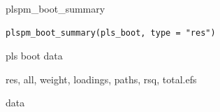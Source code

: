 \documentclass[a4paper]{book}
\begin{document}
%
\begin{Description}
plspm\_boot\_summary
\end{Description}
%
\begin{Usage}
\begin{verbatim}
plspm_boot_summary(pls_boot, type = "res")
\end{verbatim}
\end{Usage}
%
\begin{Arguments}
\begin{ldescription}
\item[\code{pls\_boot}] pls boot data

\item[\code{type}] res, all, weight, loadings, paths, rsq, total.efs
\end{ldescription}
\end{Arguments}
%
\begin{Value}
data
\end{Value}
%
\begin{Examples}
\end{Examples}
\end{document}
